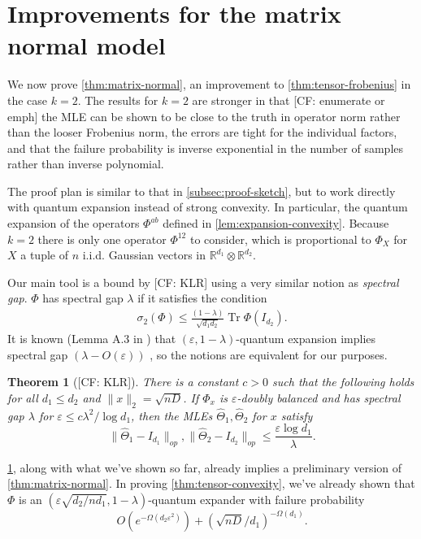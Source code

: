 \documentclass[aos]{imsart}
\newtheorem{theorem}{Theorem}[section]
\theoremstyle{definition}
\numberwithin{equation}{section}
\DeclareMathOperator{\tr}{Tr}
\newcommand{\R}{{\mathbb{R}}}
\newcommand{\htheta}{\widehat{\Theta}}
\newcommand{\ot}{\otimes}
\newcommand{\eps}{\varepsilon}
\newcommand{\CF}[1]{{\color{purple}[CF: #1]}}
\begin{document}
\section{Improvements for the matrix normal model}\label{sec:matrix-normal}



We now prove \cref{thm:matrix-normal}, an improvement to \cref{thm:tensor-frobenius} in the case $k=2$. The results for $k = 2$ are stronger in that \CF{enumerate or emph} the MLE can be shown to be close to the truth in operator norm rather than the looser Frobenius norm, the errors are tight for the individual factors, and that the failure probability is inverse exponential in the number of samples rather than inverse polynomial.

The proof plan is similar to that in \cref{subsec:proof-sketch}, but to work directly with quantum expansion instead of strong convexity. In particular, the quantum expansion of the operators $\Phi^{ab}$ defined in \cref{lem:expansion-convexity}. Because $k = 2$ there is only one operator $\Phi^{12}$ to consider, which is proportional to $\Phi_X$ for $X$ a tuple of $n$ i.i.d. Gaussian vectors in $\R^{d_1} \ot \R^{d_2}$.

Our main tool is a bound by \CF{KLR} using a very similar notion as \emph{spectral gap}. $\Phi$ has spectral gap $ \lambda$ if it satisfies the condition
\begin{align}\sigma_2(\Phi) \leq \frac{(1 - \lambda)}{\sqrt{d_1d_2}} \tr \Phi(I_{d_2}).\label{eq:spectral-gap}
\end{align}
It is known (Lemma A.3 in \cite{FM20}) that $(\eps, 1 - \lambda)$-quantum expansion implies spectral gap $(\lambda - O(\eps))$ , so the notions are equivalent for our purposes.



\begin{theorem}[\CF{KLR}]\label{thm:klr} There is a constant $c > 0$ such that the following holds for all $d_1 \leq d_2$ and $\|x\|_2 = \sqrt{n D}$. If $\Phi_{x}$ is $\eps$-doubly balanced and has spectral gap $\lambda$ for $\eps \leq c \lambda^2/\log d_1$, then the MLEs $\htheta_1,\htheta_2$ for $x$ satisfy
$$\| \htheta_1 - I_{d_1}\|_{op}, \| \htheta_2 - I_{d_2}\|_{op} \leq \frac{\eps \log d_1}{\lambda}.$$
\end{theorem}
 \cref{thm:klr}, along with what we've shown so far, already implies a preliminary version of \cref{thm:matrix-normal}. In proving \cref{thm:tensor-convexity}, we've already shown that $\Phi$ is an $(\eps \sqrt{d_2/n d_1}, 1 - \lambda)$-quantum expander with failure probability
$$O(e^{ - \Omega( d_2 \eps^2)}) + (\sqrt{nD}/{d_1})^{ - \Omega(d_1)}.$$
\end{document}
